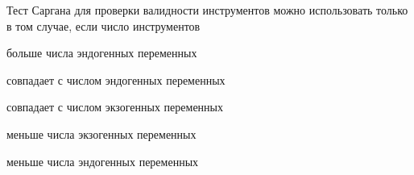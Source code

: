 
\begin{question}
Тест Саргана для проверки валидности инструментов можно использовать только в том случае, если
число инструментов
\begin{answerlist}
  \item больше числа эндогенных переменных
  \item совпадает с числом эндогенных переменных
  \item совпадает с числом экзогенных переменных
  \item меньше числа экзогенных переменных
  \item меньше числа эндогенных переменных
\end{answerlist}
\end{question}


